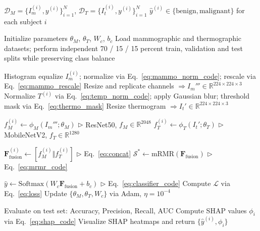 \documentclass[lettersize,journal]{IEEEtran}
\begin{document}
\begin{algorithm}[H]
\caption{Multimodal Feature Extraction and Fusion for Breast Cancer Classification}
\begin{algorithmic}[1]
\Require $\mathcal{D}_M = \{I_m^{(i)}, y^{(i)}\}_{i=1}^{N}$, $\mathcal{D}_T = \{I_t^{(i)}, y^{(i)}\}_{i=1}^{N}$
\Ensure $\hat{y}^{(i)} \in \{\text{benign}, \text{malignant}\}$ for each subject $i$

\State Initialize parameters $\theta_M$, $\theta_T$, $W_c$, $b_c$
\State Load mammographic and thermographic datasets; perform independent 70 / 15 / 15 percent train, validation and test splits while preserving class balance

\medskip
{}
    \State Histogram equalize $I_m^{(i)}$; normalize via Eq.~\eqref{eq:mammo_norm_code}; rescale via Eq.~\eqref{eq:mammo_rescale}
    \State Resize and replicate channels $\Rightarrow I_m''' \in \mathbb{R}^{224\times224\times3}$
    \State Normalize $T^{(i)}$ via Eq.~\eqref{eq:temp_norm_code}; apply Gaussian blur; threshold mask via Eq.~\eqref{eq:thermo_mask}
    \State Resize thermogram $\Rightarrow I_t' \in \mathbb{R}^{224\times224\times3}$
\EndFor

\medskip
{}
    \State $f_M^{(i)} \gets \phi_M(I_m'''; \theta_M)$ \hfill $\triangleright$ ResNet50, $f_M \in \mathbb{R}^{2048}$
    \State $f_T^{(i)} \gets \phi_T(I_t'; \theta_T)$ \hfill $\triangleright$ MobileNetV2, $f_T \in \mathbb{R}^{1280}$
\EndFor

\medskip
{}
    \State $\mathbf{F}_{\text{fusion}}^{(i)} \gets [f_M^{(i)} \Vert f_T^{(i)}]$ \hfill $\triangleright$ Eq.~\eqref{eq:concat}
    \State $\mathcal{S}^* \gets \text{mRMR}(\mathbf{F}_{\text{fusion}})$ \hfill $\triangleright$ Eq.~\eqref{eq:mrmr_code}
\EndFor

\medskip
{}
    \State $\hat{y} \gets \mathrm{Softmax}(W_c \mathbf{F}_{\text{fusion}} + b_c)$ \hfill $\triangleright$ Eq.~\eqref{eq:classifier_code}
    \State Compute $\mathcal{L}$ via Eq.~\eqref{eq:loss}
    \State Update $\{\theta_M, \theta_T, W_c\}$ via Adam, $\eta = 10^{-4}$
\EndFor

\medskip
{}
\State Evaluate on test set: Accuracy, Precision, Recall, AUC
\State Compute SHAP values $\phi_i$ via Eq.~\eqref{eq:shap_code}
\State Visualize SHAP heatmaps and return $\{\hat{y}^{(i)}, \phi_i\}$

\end{algorithmic}
\end{algorithm}
\vspace{-1em}
\end{document}
